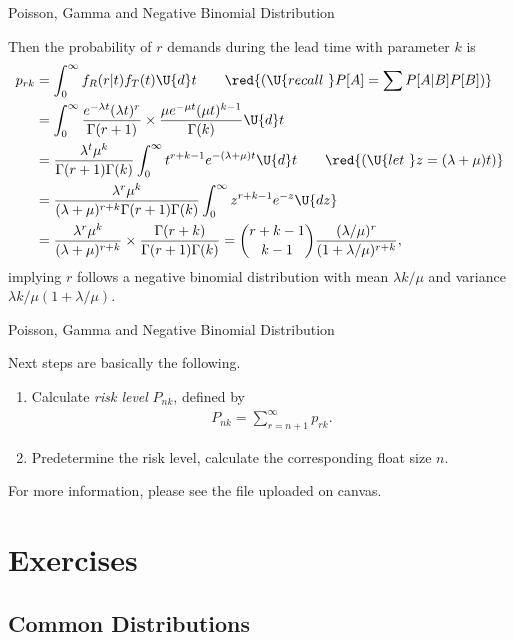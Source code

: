 \begin{frame}{Poisson, Gamma and Negative Binomial Distribution}

\justifying
{} Then the probability of $r$ demands during the lead time with parameter $k$ is
\begin{align*}
p_{rk} & = \int_0^{\infty} f_R(r|t) f_T(t) \U{d}t \qquad \red{(\U{recall\ } P[A] = \sum P[A|B]P[B])} \\
& = \int_0^{\infty} \frac{e^{-\lambda t}(\lambda t)^r}{\Gamma(r+1)} \times \frac{\mu e^{-\mu t}(\mu t)^{k-1}}{\Gamma(k)} \U{d}t \\
& = \frac{\lambda^t \mu^k}{\Gamma(r+1)\Gamma(k)}\int_0^{\infty} t^{r+k-1}e^{-(\lambda+\mu)t}\U{d}t \qquad \red{(\U{let\ }z = (\lambda + \mu)t)} \\
& = \frac{\lambda^r\mu^k}{(\lambda+\mu)^{r+k}\Gamma(r+1)\Gamma(k)}\int_0^{\infty} z^{r+k-1}e^{-z}\U{dz} \\
& = \frac{\lambda^r\mu^k}{(\lambda+\mu)^{r+k}}\times \frac{\Gamma(r+k)}{\Gamma(r+1)\Gamma(k)} = \binom{r+k-1}{k-1}\frac{(\lambda/\mu)^r}{(1+\lambda/\mu)^{r+k}},
\end{align*}
implying $r$ follows a negative binomial distribution with mean $\lambda k/\mu$ and variance $\lambda k/\mu(1+\lambda/\mu)$.


\end{frame}


\begin{frame}{Poisson, Gamma and Negative Binomial Distribution}

\justifying
{} Next steps are basically the following.
\begin{enumerate}
	\justifying
	\item Calculate \emph{risk level} $P_{nk}$, defined by
	\begin{align*}
	P_{nk} = \sum_{r=n+1}^{\infty} p_{rk}.
	\end{align*}
	\item Predetermine the risk level, calculate the corresponding float size $n$.
\end{enumerate}
For more information, please see the file uploaded on canvas.

\end{frame}


\section{Exercises}

\subsection{Common Distributions}

